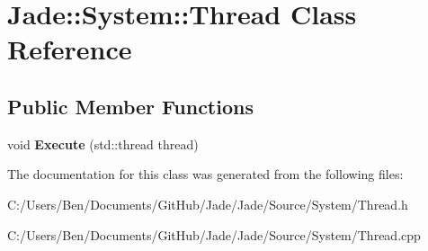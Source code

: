 \hypertarget{class_jade_1_1_system_1_1_thread}{}\section{Jade\+:\+:System\+:\+:Thread Class Reference}
\label{class_jade_1_1_system_1_1_thread}
\subsection*{Public Member Functions}
\begin{DoxyCompactItemize}
\item 
\hypertarget{class_jade_1_1_system_1_1_thread_a192fdadcd198c2d6110906fbdd56f92a}{}void {\bfseries Execute} (std\+::thread thread)\label{class_jade_1_1_system_1_1_thread_a192fdadcd198c2d6110906fbdd56f92a}

\end{DoxyCompactItemize}


The documentation for this class was generated from the following files\+:\begin{DoxyCompactItemize}
\item 
C\+:/\+Users/\+Ben/\+Documents/\+Git\+Hub/\+Jade/\+Jade/\+Source/\+System/Thread.\+h\item 
C\+:/\+Users/\+Ben/\+Documents/\+Git\+Hub/\+Jade/\+Jade/\+Source/\+System/Thread.\+cpp\end{DoxyCompactItemize}
